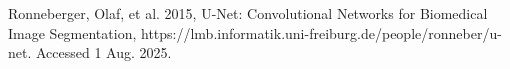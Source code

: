 \begin{thebibliography}{00}
 Ronneberger, Olaf, et al. 2015, U-Net: Convolutional Networks for Biomedical Image Segmentation, https://lmb.informatik.uni-freiburg.de/people/ronneber/u-net. Accessed 1 Aug. 2025. 
\end{thebibliography}

